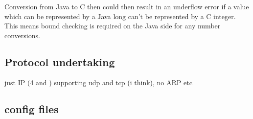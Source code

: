 \documentclass[final_report.tex]{subfiles}
\begin{document}
Conversion from Java to C then could then result in an underflow error if a value which can be represented by a Java long can't be represented by a C integer. This means bound checking is required on the Java side for any number conversions.


\subsection{Protocol undertaking}
just IP (4 and ) supporting udp and tcp (i think), no ARP etc

\subsection{config files}
\end{document}
